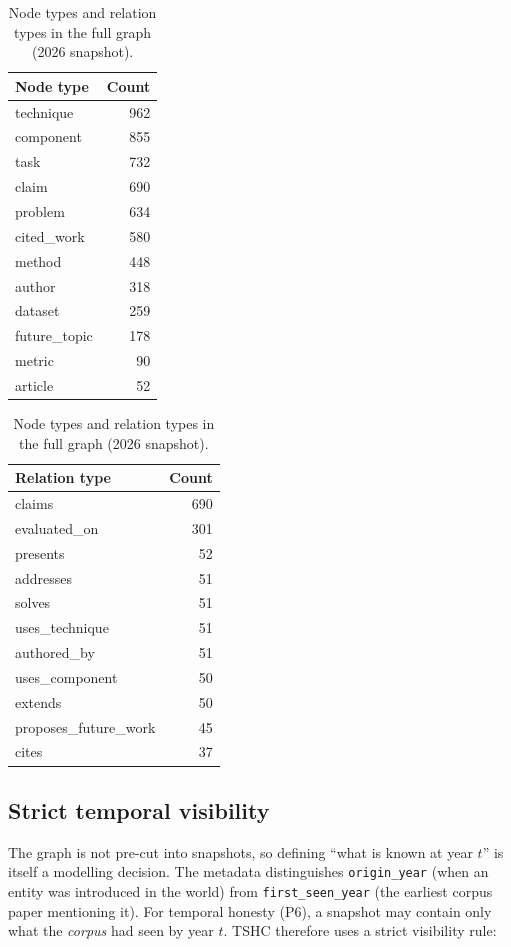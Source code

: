 \documentclass[11pt,a4paper]{article}
\theoremstyle{remark}
\newcommand{\code}[1]{\texttt{\small #1}}
\begin{document}
\begin{table}[!htbp]
\centering
\caption{Node types and relation types in the full graph (2026 snapshot).}
\label{tab:types}
\begin{minipage}[t]{0.45\linewidth}\centering
\begin{tabular}{lr}
\toprule
Node type & Count\\
\midrule
technique & 962\\
component & 855\\
task & 732\\
claim & 690\\
problem & 634\\
cited\_work & 580\\
method & 448\\
author & 318\\
dataset & 259\\
future\_topic & 178\\
metric & 90\\
article & 52\\
\bottomrule
\end{tabular}
\end{minipage}\hfill
\begin{minipage}[t]{0.5\linewidth}\centering
\begin{tabular}{lr}
\toprule
Relation type & Count\\
\midrule
claims & 690\\
evaluated\_on & 301\\
presents & 52\\
addresses & 51\\
solves & 51\\
uses\_technique & 51\\
authored\_by & 51\\
uses\_component & 50\\
extends & 50\\
proposes\_future\_work & 45\\
cites & 37\\
\bottomrule
\end{tabular}
\end{minipage}
\end{table}

\subsection{Strict temporal visibility}
\label{sec:visibility}

The graph is not pre-cut into snapshots, so defining ``what is known at year $t$'' is
itself a modelling decision. The metadata distinguishes \code{origin\_year} (when an
entity was introduced in the world) from \code{first\_seen\_year} (the earliest
corpus paper mentioning it). For temporal honesty (P6), a snapshot may contain only
what the \emph{corpus} had seen by year $t$. TSHC therefore uses a strict visibility
rule:
\end{document}
